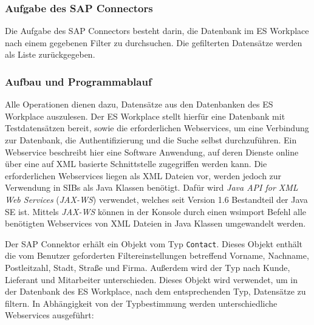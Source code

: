\javalstset{}{}
\subsubsection{Aufgabe des SAP Connectors}

Die Aufgabe des SAP Connectors besteht darin, die Datenbank im ES Workplace nach einem 
gegebenen Filter zu durchsuchen. Die gefilterten Datensätze werden als Liste zurückgegeben. 

\subsubsection{Aufbau und Programmablauf}

Alle Operationen dienen dazu, Datensätze aus den Datenbanken des ES Workplace auszulesen. Der ES Workplace stellt hierfür 
eine Datenbank mit Testdatensätzen bereit, sowie die erforderlichen Webservices, um eine Verbindung zur Datenbank, 
die Authentifizierung und die Suche selbst durchzuführen. Ein Webservice beschreibt hier eine Software Anwendung, auf 
deren Dienste online über eine auf XML basierte Schnittstelle zugegriffen werden kann. Die erforderlichen Webservices 
liegen als XML Dateien vor, werden jedoch zur Verwendung in SIBs als Java Klassen benötigt. Dafür wird \emph{Java API for XML Web Services} 
(\emph{JAX-WS}) verwendet, welches seit Version 1.6  Bestandteil der Java SE ist. Mittels \emph{JAX-WS} können in der Konsole durch 
einen wsimport Befehl alle benötigten Webservices von XML Dateien in Java Klassen umgewandelt werden. 

Der SAP Connektor erhält ein Objekt vom Typ \lstinline{Contact}. Dieses Objekt enthält die vom Benutzer geforderten Filtereinstellungen 
betreffend Vorname, Nachname, Postleitzahl, Stadt, Straße und Firma. Außerdem wird der Typ nach Kunde, Lieferant und 
Mitarbeiter unterschieden. Dieses Objekt wird verwendet, um in der Datenbank des ES Workplace, nach dem entsprechenden Typ,
Datensätze zu filtern. In Abhängigkeit von der Typbestimmung werden unterschiedliche Webservices ausgeführt:

